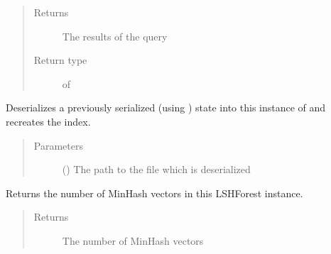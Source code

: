 \documentclass[letterpaper,10pt,english]{sphinxmanual}
\begin{document}
\begin{fulllineitems}
\begin{fulllineitems}
\begin{quote}
\begin{description}
\item[{Returns}] \leavevmode
The results of the query

\item[{Return type}] \leavevmode
{} of 

\end{description}\end{quote}

\end{fulllineitems}


\begin{fulllineitems}
\label{\detokenize{documentation:tmap.LSHForest.restore}}
Deserializes a previously serialized (using {\hyperref[\detokenize{documentation:tmap.LSHForest.store}]{}}) state into this instance of {\hyperref[\detokenize{documentation:tmap.LSHForest}]{}} and recreates the index.
\begin{quote}\begin{description}
\item[{Parameters}] \leavevmode
{} () \textendash{} The path to the file which is deserialized

\end{description}\end{quote}

\end{fulllineitems}


\begin{fulllineitems}
\label{\detokenize{documentation:tmap.LSHForest.size}}
Returns the number of MinHash vectors in this LSHForest instance.
\begin{quote}\begin{description}
\item[{Returns}] \leavevmode
The number of MinHash vectors


\end{description}
\end{quote}
\end{fulllineitems}
\end{fulllineitems}
\end{document}
